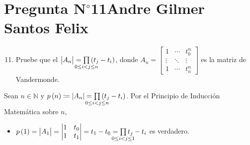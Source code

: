 \section{Pregunta N$^{\circ}$11\qquad Andre Gilmer Santos Felix}



\begin{frame}
	\begin{enumerate}\setcounter{enumi}{10}
		\item

		      Pruebe que el
		      \begin{math}
			      \begin{vmatrix}
				      A_{n}
			      \end{vmatrix}=
			      \prod\limits_{\mathclap{0\leq i< j\leq n}}
			      \left(t_{j}-t_{i}\right)
		      \end{math},
		      donde
		      \begin{math}
			      A_{n}=
			      \begin{bmatrix}
				      1      & \cdots & t_{0}^{n} \\
				      \vdots & \ddots & \vdots    \\
				      1      & \cdots & t_{n}^{n}
			      \end{bmatrix}
		      \end{math}
		      es la matriz de Vandermonde.
	\end{enumerate}

	\begin{solution}
		Sean $n\in\mathbb{N}$ y
		\begin{math}
			p\left(n\right)\coloneqq
			\left|A_{n}\right|=
			\prod\limits_{\mathclap{0\leq i< j\leq n}}
			\left(t_{j}-t_{i}\right)
		\end{math}.
		Por el \alert{Principio de Inducción Matemática} sobre $n$,

		\begin{itemize}
			\item

			      \begin{math}
				      p\left(1\right)=
				      \begin{vmatrix}
					      A_{1}
				      \end{vmatrix}=
				      \begin{vmatrix}
					      1 & t_{0} \\
					      1 & t_{1}
				      \end{vmatrix}=
				      t_{1}-t_{0}=
				      \prod\limits_{\mathclap{0\leq i< j\leq 1}}
				      t_{j}-t_{i}
			      \end{math}
			      es verdadero.


\end{itemize}
\end{solution}
\end{frame}

